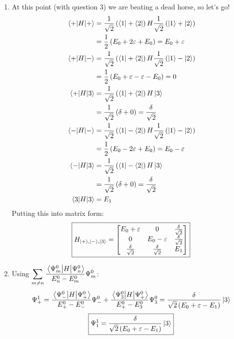 \documentclass[11pt]{article}
\begin{document}
\begin{enumerate}[label=\alph*)]
\item At this point (with question 3) we are beating a dead horse, so let's go!
\begin{align*}
\mel{+}{H}{+} & = \frac{1}{\sqrt{2}}\left(\bra{1} + \bra{2}\right)H\frac{1}{\sqrt{2}}\left(\ket{1} + \ket{2}\right)\\
& = \frac{1}{2} \left(E_0 + 2\varepsilon + E_0\right) = E_0 +\varepsilon\\
\mel{+}{H}{-} & = \frac{1}{\sqrt{2}}\left(\bra{1} + \bra{2}\right)H\frac{1}{\sqrt{2}}\left(\ket{1} - \ket{2}\right)\\
& = \frac{1}{2} \left(E_0 + \varepsilon -\varepsilon - E_0\right) = 0\\
\mel{+}{H}{3} & = \frac{1}{\sqrt{2}}\left(\bra{1} + \bra{2}\right)H\ket{3}\\
& = \frac{1}{\sqrt{2}}\left(\delta + 0 \right) = \frac{\delta}{\sqrt{2}}\\
\mel{-}{H}{-} & = \frac{1}{\sqrt{2}}\left(\bra{1} - \bra{2}\right)H\frac{1}{\sqrt{2}}\left(\ket{1} - \ket{2}\right)\\
& = \frac{1}{2} \left(E_0 - 2\varepsilon + E_0\right) = E_0 -\varepsilon\\
\mel{-}{H}{3} & = \frac{1}{\sqrt{2}}\left(\bra{1} - \bra{2}\right)H\ket{3}\\
& = \frac{1}{\sqrt{2}}\left(\delta + 0 \right) = \frac{\delta}{\sqrt{2}}\\
\mel{3}{H}{3} & = E_1
\end{align*}
Putting this into matrix form:
\[\boxed{H_{\ket{+}, \ket{-}, \ket{3}} = \mqty[E_0+\varepsilon & 0 & \frac{\delta}{\sqrt{2}} \\ 0 & E_0-\varepsilon & \frac{\delta}{\sqrt{2}} \\ \frac{\delta}{\sqrt{2}} &\frac{\delta}{\sqrt{2}} & E_1]}\]

\item
Using $\displaystyle \sum_{m\neq n}\frac{\mel{\Psi_m^0}{H}{\Psi_n^0}}{E_n^0 - E_m^0} \Psi_m^0$:
\[\Psi_+^1 = \frac{\mel{\Psi_-^0}{H}{\Psi_+^0}}{E_+^0 - E_-^0}\Psi_-^0 + \frac{\mel{\Psi_3^0}{H}{\Psi_+^0}}{E_+^0-E_3^0}\Psi^0_3 = \frac{\delta}{\sqrt{2}\left(E_0 + \varepsilon - E_1\right)}\ket{3}\]
\[\boxed{\Psi_1^1 = \frac{\delta}{\sqrt{2}\left(E_0 + \varepsilon - E_1\right)}\ket{3}}\]

\end{enumerate}
\end{document}
